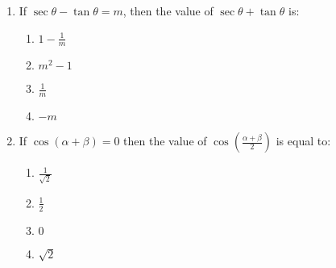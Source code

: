 
\begin{enumerate}

\item If $\sec\theta - \tan\theta = m$, then the value of $\sec\theta + \tan\theta$ is:
\begin{enumerate}
    \item ${1}-\frac{1}{m}$                                                       
    \item $m^2 - 1$
    \item $\frac{1}{m}$
    \item $-m$
\end{enumerate}

 \item If $\cos(\alpha + \beta) = 0$ then the value of $\cos\left(\frac{\alpha + \beta}{2}\right)$ is equal to:
 \begin{enumerate}
    \item $\frac{1}{\sqrt{2}}$
    \item $\frac{1}{2}$
    \item $0$
    \item $\sqrt{2}$
\end{enumerate}
\end{enumerate}
